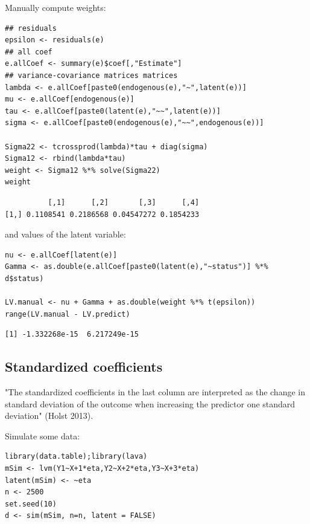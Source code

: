 \documentclass{article}
\begin{document}
\clearpage

Manually compute weights: 
\lstset{language=r,label= ,caption= ,captionpos=b,numbers=none}
\begin{lstlisting}
## residuals
epsilon <- residuals(e) 
## all coef
e.allCoef <- summary(e)$coef[,"Estimate"]
## variance-covariance matrices matrices
lambda <- e.allCoef[paste0(endogenous(e),"~",latent(e))]
mu <- e.allCoef[endogenous(e)]
tau <- e.allCoef[paste0(latent(e),"~~",latent(e))]
sigma <- e.allCoef[paste0(endogenous(e),"~~",endogenous(e))]

Sigma22 <- tcrossprod(lambda)*tau + diag(sigma)
Sigma12 <- rbind(lambda*tau)
weight <- Sigma12 %*% solve(Sigma22)
weight
\end{lstlisting}

\begin{verbatim}
          [,1]      [,2]       [,3]      [,4]
[1,] 0.1108541 0.2186568 0.04547272 0.1854233
\end{verbatim}

and values of the latent variable:
\lstset{language=r,label= ,caption= ,captionpos=b,numbers=none}
\begin{lstlisting}
nu <- e.allCoef[latent(e)]
Gamma <- as.double(e.allCoef[paste0(latent(e),"~status")] %*% d$status)

LV.manual <- nu + Gamma + as.double(weight %*% t(epsilon))
range(LV.manual - LV.predict)
\end{lstlisting}

\begin{verbatim}
[1] -1.332268e-15  6.217249e-15
\end{verbatim}

\subsection{Standardized coefficients}
\label{sec:orgd5f0eb4}

"The standardized coefficients in the last column are interpreted as
the change in standard deviation of the outcome when increasing the
predictor one standard deviation" (Holst 2013).

\bigskip

Simulate some data:
\lstset{language=r,label= ,caption= ,captionpos=b,numbers=none}
\begin{lstlisting}
library(data.table);library(lava)
mSim <- lvm(Y1~X+1*eta,Y2~X+2*eta,Y3~X+3*eta)
latent(mSim) <- ~eta
n <- 2500
set.seed(10)
d <- sim(mSim, n=n, latent = FALSE)
\end{lstlisting}
\end{document}

